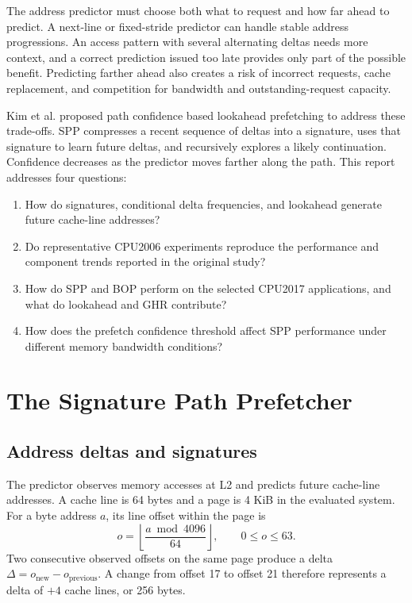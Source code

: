 \documentclass[a4paper,11pt]{article}
\begin{document}
The address predictor must choose both what to request and how far ahead to predict. A next-line or fixed-stride predictor can handle stable address progressions. An access pattern with several alternating deltas needs more context, and a correct prediction issued too late provides only part of the possible benefit. Predicting farther ahead also creates a risk of incorrect requests, cache replacement, and competition for bandwidth and outstanding-request capacity.

Kim et al. proposed path confidence based lookahead prefetching to address these trade-offs\cite{kim2016}. SPP compresses a recent sequence of deltas into a signature, uses that signature to learn future deltas, and recursively explores a likely continuation. Confidence decreases as the predictor moves farther along the path. This report addresses four questions:
\begin{enumerate}
\item How do signatures, conditional delta frequencies, and lookahead generate future cache-line addresses?
\item Do representative CPU2006 experiments reproduce the performance and component trends reported in the original study?
\item How do SPP and BOP perform on the selected CPU2017 applications, and what do lookahead and GHR contribute?
\item How does the prefetch confidence threshold affect SPP performance under different memory bandwidth conditions?
\end{enumerate}

\section{The Signature Path Prefetcher}
\subsection{Address deltas and signatures}
The predictor observes memory accesses at L2 and predicts future cache-line addresses. A cache line is 64 bytes and a page is 4 KiB in the evaluated system. For a byte address $a$, its line offset within the page is
\[
o=\left\lfloor\frac{a\bmod4096}{64}\right\rfloor,\qquad 0\leq o\leq63.
\]
Two consecutive observed offsets on the same page produce a delta $\Delta=o_{\mathrm{new}}-o_{\mathrm{previous}}$. A change from offset 17 to offset 21 therefore represents a delta of $+4$ cache lines, or 256 bytes.
\end{document}
